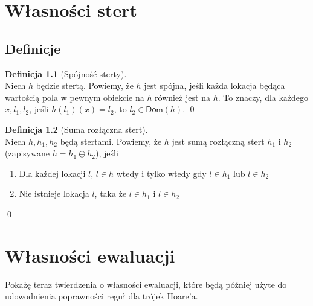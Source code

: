 \documentclass[]{pracamgr}
\renewcommand \| {\hspace{0.75em} | \hspace{0.75em} }
\renewcommand \[ {[\![}
\renewcommand \] {]\!]}
\theoremstyle{definition}
\newtheorem{definition}{Definicja}[section]
\newcommand{\dom}[1]{\mathsf{Dom}(#1)\xspace}
\begin{document}
\chapter{Własności stert}

\section{Definicje}
\begin{definition}[Spójność sterty]{\ } \\
Niech $h$ będzie stertą.
Powiemy, że $h$ jest spójna, jeśli każda lokacja będąca wartością pola w pewnym obiekcie na $h$
również jest na $h$.
To znaczy, dla każdego $x, l_1, l_2$, jeśli $h(l_1)(x) = l_2$, to $l_2 \in \dom{h}$.
\qed
\end{definition}

\begin{definition}[Suma rozłączna stert]{\ } \\
Niech $h, h_1, h_2$ będą stertami.
Powiemy, że $h$ jest sumą rozłączną stert $h_1$ i $h_2$ (zapisywane $h = h_1 \oplus h_2$),
jeśli
\begin{enumerate}
 \item Dla każdej lokacji $l$, $l \in h$ wtedy i tylko wtedy gdy $l \in h_1$ lub $l \in h_2$
 \item Nie istnieje lokacja $l$, taka że $l \in h_1$ i $l \in h_2$
\end{enumerate}

\qed
\end{definition}


\chapter{Własności ewaluacji}
Pokażę teraz twierdzenia o własności ewaluacji, które będą później użyte do udowodnienia poprawności reguł dla trójek Hoare'a.
\end{document}
